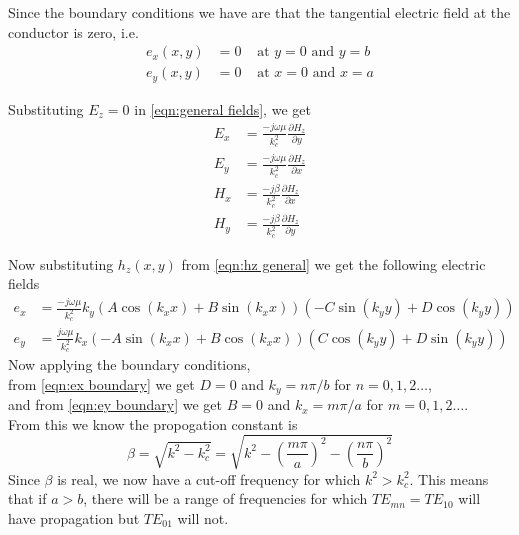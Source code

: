 \begin{enumerate}
Since the boundary conditions we have are that the tangential electric field at the conductor is zero, i.e.
\begin{subequations}
\begin{align}
e_x(x,y)& =0 & \text{ at } y=0 \text{ and } y=b
\label{eqn:ex boundary}\\
e_y(x,y)& =0 & \text{ at } x=0 \text{ and } x=a
\label{eqn:ey boundary}
\end{align}
\end{subequations}

Substituting $E_z=0$ in \ref{eqn:general fields}, we get
\begin{subequations}
\label{eqn:TE transverse diff}
\begin{align}
E_x& =\frac{-j\omega\mu}{k_c^2}\frac{\partial H_z}{\partial y}\\
E_y& =\frac{-j\omega\mu}{k_c^2}\frac{\partial H_z}{\partial x}\\
H_x& =\frac{-j\beta}{k_c^2}\frac{\partial H_z}{\partial x}\\
H_y& =\frac{-j\beta}{k_c^2}\frac{\partial H_z}{\partial y}
\end{align}
\end{subequations}

Now substituting $h_z(x,y)$ from \ref{eqn:hz general} we get the following electric fields
\begin{subequations}
\begin{align}
e_x& =\frac{-j\omega\mu}{k_c^2}k_y(A\cos(k_xx)+B\sin(k_xx))(-C\sin(k_yy)+D\cos(k_yy))\\
e_y& =\frac{j\omega\mu}{k_c^2}k_x(-A\sin(k_xx)+B\cos(k_xx))(C\cos(k_yy)+D\sin(k_yy))
\end{align}
\end{subequations}
Now applying the boundary conditions,\\
from \ref{eqn:ex boundary} we get $D=0$ and $k_y=n\pi/b$ for $n={0,1,2\ldots}$,\\
and from \ref{eqn:ey boundary} we get $B=0$ and $k_x=m\pi/a$ for $m={0,1,2\ldots}$.\\
From this we know the propogation constant is
\begin{equation}
\beta = \sqrt{k^2-k_c^2}=\sqrt{k^2-\left(\frac{m\pi}{a}\right)^2-\left(\frac{n\pi}{b}\right)^2}
\end{equation}
Since $\beta$ is real, we now have a cut-off frequency for which $k^2>k_c^2$. This means that if $a>b$, there will be a range of frequencies for which $TE_{mn}=TE_{10}$ will have propagation but $TE_{01}$ will not.


\end{enumerate}
